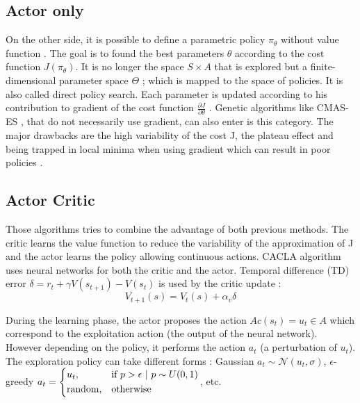 \subsection{Actor only}

On the other side, it is possible to define a parametric policy $\pi_{\theta}$ without value function \cite{Sutton1999}.
The goal is to found the best parameters $\theta$ according to the cost function $J(\pi_{\theta})$. 
It is no longer the space $S \times A$ that is explored but a finite-dimensional parameter space $\Theta$ ;
which is mapped to the space of policies. It is also called direct policy search.
Each parameter is updated according to his contribution to gradient of the cost function 
$ \frac{\partial J}{\partial \theta} $ \cite{Kober2010a}.
Genetic algorithms like CMAS-ES \cite{Hansen2001}, that do not necessarily use gradient, can also enter is this category.
The major drawbacks are the high variability of the cost J, the plateau effect and being trapped in local minima when using gradient which can result in poor policies \cite{Grondman2012, Konda2003}.

\subsection{Actor Critic}

Those algorithms \cite{Konda2003} tries to combine the advantage of both previous methods.
The critic learns the value function to reduce the variability of the approximation of J 
and the actor learns the policy allowing continuous actions.
CACLA algorithm \cite{VanHasselt2007a} uses neural networks for both the critic and the actor.
Temporal difference (TD) error $\delta = r_t + \gamma V(s_{t+1}) - V(s_t)$ is used by the critic update :
\begin{equation}
 V_{t+1}(s) = V_t(s) + \alpha_v \delta
\end{equation}

During the learning phase, the actor proposes the action $Ac(s_t) = u_t \in A$  which correspond to the exploitation action (the output of the neural network).
However depending on the policy, it performs the action $a_t$ (a perturbation of $u_t$). The exploration policy can take different forms : Gaussian $a_t \sim \mathcal{N}(u_t, \sigma)$, 
$\epsilon$-greedy 
$a_t = 
\begin{dcases} u_t, & \text{if }p > \epsilon\ |\ p \sim U(0,1) \\
      \text{random}, & \text{otherwise}
\end{dcases}$, etc.


